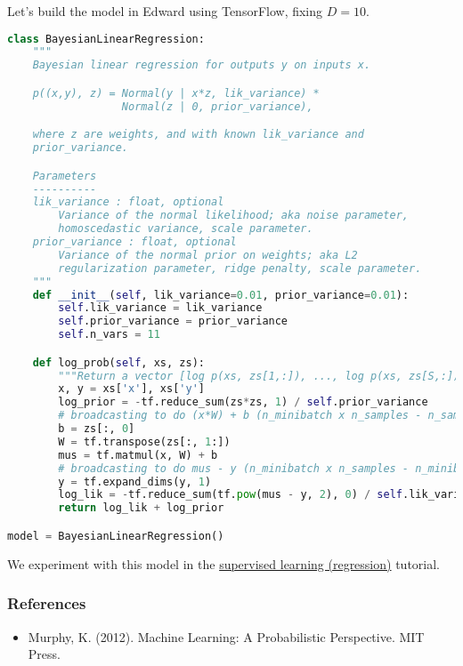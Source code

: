 Let's build the model in Edward using TensorFlow, fixing $D=10$.
\begin{lstlisting}[language=Python]
class BayesianLinearRegression:
    """
    Bayesian linear regression for outputs y on inputs x.

    p((x,y), z) = Normal(y | x*z, lik_variance) *
                  Normal(z | 0, prior_variance),

    where z are weights, and with known lik_variance and
    prior_variance.

    Parameters
    ----------
    lik_variance : float, optional
        Variance of the normal likelihood; aka noise parameter,
        homoscedastic variance, scale parameter.
    prior_variance : float, optional
        Variance of the normal prior on weights; aka L2
        regularization parameter, ridge penalty, scale parameter.
    """
    def __init__(self, lik_variance=0.01, prior_variance=0.01):
        self.lik_variance = lik_variance
        self.prior_variance = prior_variance
        self.n_vars = 11

    def log_prob(self, xs, zs):
        """Return a vector [log p(xs, zs[1,:]), ..., log p(xs, zs[S,:])]."""
        x, y = xs['x'], xs['y']
        log_prior = -tf.reduce_sum(zs*zs, 1) / self.prior_variance
        # broadcasting to do (x*W) + b (n_minibatch x n_samples - n_samples)
        b = zs[:, 0]
        W = tf.transpose(zs[:, 1:])
        mus = tf.matmul(x, W) + b
        # broadcasting to do mus - y (n_minibatch x n_samples - n_minibatch x 1)
        y = tf.expand_dims(y, 1)
        log_lik = -tf.reduce_sum(tf.pow(mus - y, 2), 0) / self.lik_variance
        return log_lik + log_prior

model = BayesianLinearRegression()
\end{lstlisting}

We experiment with this model in the \href{tut_supervised_regression.html}{supervised
learning (regression)} tutorial.

\subsubsection{References}\label{references}

\begin{itemize}
\item
  Murphy, K. (2012). Machine Learning: A Probabilistic Perspective. MIT Press.
\end{itemize}
